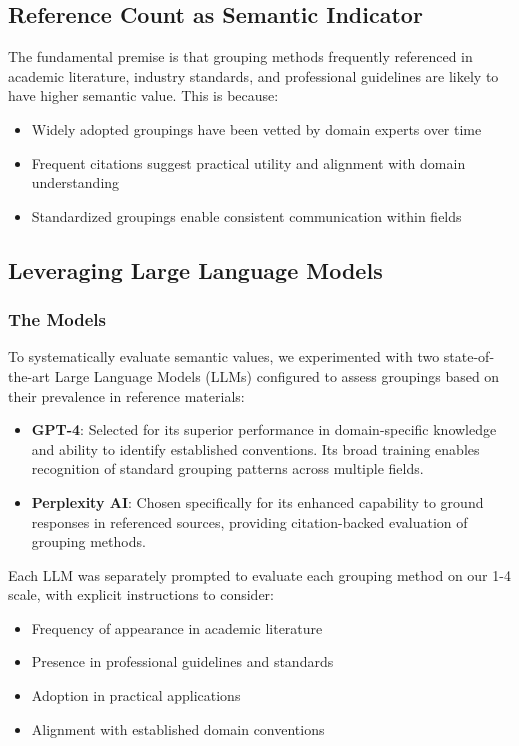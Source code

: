 \documentclass{article}
\begin{document}
\subsection*{Reference Count as Semantic Indicator}
The fundamental premise is that grouping methods frequently referenced in academic literature, industry standards, and professional guidelines are likely to have higher semantic value. This is because:

\begin{itemize}
    \item Widely adopted groupings have been vetted by domain experts over time
    \item Frequent citations suggest practical utility and alignment with domain understanding
    \item Standardized groupings enable consistent communication within fields
\end{itemize}

\subsection*{Leveraging Large Language Models}
\subsubsection*{The Models}
To systematically evaluate semantic values, we experimented with two state-of-the-art Large Language Models (LLMs) configured to assess groupings based on their prevalence in reference materials:

\begin{itemize}
    \item \textbf{GPT-4}: Selected for its superior performance in domain-specific knowledge and ability to identify established conventions. Its broad training enables recognition of standard grouping patterns across multiple fields.
    
    \item \textbf{Perplexity AI}: Chosen specifically for its enhanced capability to ground responses in referenced sources, providing citation-backed evaluation of grouping methods.
\end{itemize}

Each LLM was separately prompted to evaluate each grouping method on our 1-4 scale, with explicit instructions to consider:
\begin{itemize}
    \item Frequency of appearance in academic literature
    \item Presence in professional guidelines and standards
    \item Adoption in practical applications
    \item Alignment with established domain conventions
\end{itemize}
\end{document}
